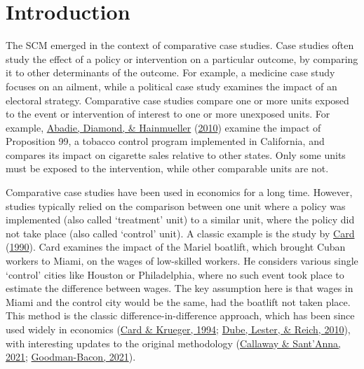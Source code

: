 \documentclass[12pt,nobind, a4paper]{reedthesis}
\begin{document}
 \hypertarget{introduction}{%
 \section{Introduction}\label{introduction}}

 The SCM emerged in the context of comparative case studies. Case studies often study the effect of a policy or intervention on a particular outcome, by comparing it to other determinants of the outcome. For example, a medicine case study focuses on an ailment, while a political case study examines the impact of an electoral strategy. Comparative case studies compare one or more units exposed to the event or intervention of interest to one or more unexposed units. For example, \protect\hyperlink{ref-abadie_synthetic_2010}{Abadie, Diamond, \& Hainmueller} (\protect\hyperlink{ref-abadie_synthetic_2010}{2010}) examine the impact of Proposition 99, a tobacco control program implemented in California, and compares its impact on cigarette sales relative to other states. Only some units must be exposed to the intervention, while other comparable units are not.
 \linebreak

 Comparative case studies have been used in economics for a long time. However, studies typically relied on the comparison between one unit where a policy was implemented (also called `treatment' unit) to a similar unit, where the policy did not take place (also called `control' unit). A classic example is the study by \protect\hyperlink{ref-card_impact_1990}{Card} (\protect\hyperlink{ref-card_impact_1990}{1990}). Card examines the impact of the Mariel boatlift, which brought Cuban workers to Miami, on the wages of low-skilled workers. He considers various single `control' cities like Houston or Philadelphia, where no such event took place to estimate the difference between wages. The key assumption here is that wages in Miami and the control city would be the same, had the boatlift not taken place. This method is the classic difference-in-difference approach, which has been since used widely in economics (\protect\hyperlink{ref-card_minimum_1994}{Card \& Krueger, 1994}; \protect\hyperlink{ref-dube_minimum_2010}{Dube, Lester, \& Reich, 2010}), with interesting updates to the original methodology (\protect\hyperlink{ref-callaway_difference_differences_2021}{Callaway \& Sant'Anna, 2021}; \protect\hyperlink{ref-goodman-bacon_difference_differences_2021}{Goodman-Bacon, 2021}).
 \linebreak
\end{document}

